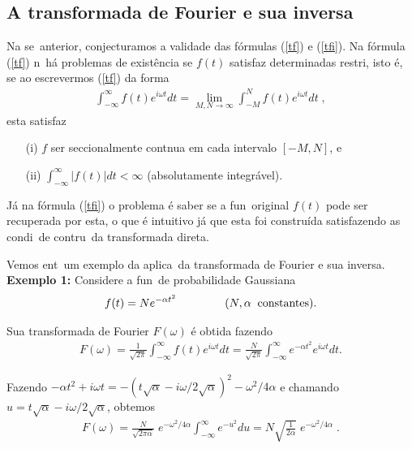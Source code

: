 \subsection{A transformada de Fourier e sua inversa} 
Na se\cao\ anterior, conjecturamos a validade das f\'ormulas
(\ref{tf}) e (\ref{tfi}). Na f\'ormula (\ref{tf}) n\ao\ h\'a
problemas de exist\^encia se $f(t)$ satisfaz determinadas restri\coes,
isto \'e, se ao escrevermos (\ref{tf}) da forma
\begin{eqnarray}
\int_{-\infty}^{\infty} f(t) e^{i \omega t} dt =
\lim_{M,N \longrightarrow \infty} \int_{-M}^{N} f(t) e^{i \omega t} dt \; ,
\end{eqnarray}
esta satisfaz
\begin{itemize}
\item[(i)] $f$ ser seccionalmente cont\ih nua em cada intervalo $[-M,N]$, e
\item[(ii)] $\int_{-\infty}^{\infty} |f(t)| dt < \infty$
(absolutamente integr\'avel).
\end{itemize}
J\'a na f\'ormula (\ref{tfi}) o problema \'e saber se a fun\cao\ original
$f(t)$ pode ser recuperada por esta, o que \'e intuitivo j\'a que esta
foi constru\'ida satisfazendo as condi\coes\ de contru\cao\ da transformada
direta.

Vemos ent\ao\ um exemplo da aplica\cao\ da transformada de Fourier
e sua inversa. 
\\
{\bf Exemplo 1:} Considere a fun\cao\ de probabilidade Gaussiana
\begin{eqnarray}
f(t) = N e^{-\alpha t^2} \hspace{1.5cm} (N, \alpha \;\; \mbox{constantes}).
\end{eqnarray}

Sua transformada de Fourier $F(\omega)$ \'e obtida fazendo
\begin{eqnarray}
F(\omega) = \frac{1}{\sqrt{2\pi}}\int_{-\infty}^{\infty} f(t)
e^{i \omega t} dt = \frac{N}{\sqrt{2\pi}}\int_{-\infty}^{\infty}
e^{-\alpha t^2} e^{i \omega t} dt.
\end{eqnarray}

Fazendo $-\alpha t^2 + i \omega t = -(t\sqrt{\alpha} -
i\omega/2\sqrt{\alpha})^2 - \omega^2/4\alpha$ e chamando
$u = t\sqrt{\alpha} - i\omega/2\sqrt{\alpha}$, obtemos
\begin{eqnarray}
F(\omega) = \frac{N}{\sqrt{2\pi\alpha}} \; e^{-\omega^2/4\alpha}
\int_{-\infty}^{\infty} e^{-u^2} du = N \sqrt{\frac{1}{2\alpha}}\;
e^{-\omega^2/4\alpha} \; .
\end{eqnarray}

